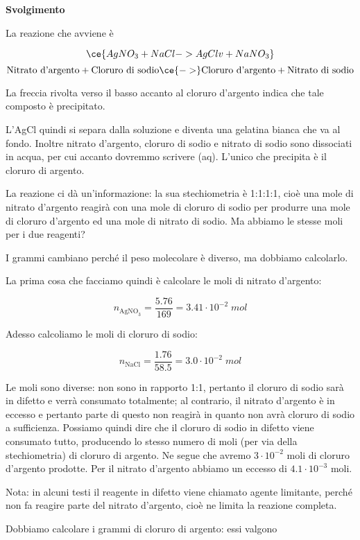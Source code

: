 \vspace{0.2cm}\large\textbf{Svolgimento}\normalsize

\vspace{0.2cm}La reazione che avviene è

$$\ce{AgNO_3 + NaCl -> AgCl v + NaNO_3}$$
$$\text{Nitrato d'argento} + \text{Cloruro di sodio} \ce{->} \text{Cloruro d'argento} + \text{Nitrato di sodio}$$

La freccia rivolta verso il basso accanto al cloruro d'argento indica che tale composto è precipitato.

L'AgCl quindi si separa dalla soluzione e diventa una gelatina bianca che va al fondo. Inoltre nitrato d'argento, cloruro di sodio e nitrato di sodio sono dissociati in acqua, per cui accanto dovremmo scrivere (aq). L'unico che precipita è il cloruro di argento.

La reazione ci dà un'informazione: la sua stechiometria è 1:1:1:1, cioè una mole di nitrato d'argento reagirà con una mole di cloruro di sodio per produrre una mole di cloruro d'argento ed una mole di nitrato di sodio. Ma abbiamo le stesse moli per i due reagenti?

I grammi cambiano perché il peso molecolare è diverso, ma dobbiamo calcolarlo.

La prima cosa che facciamo quindi è calcolare le moli di nitrato d'argento:

$$n_{\text{AgNO}_3}=\frac{5.76}{169}=3.41 \cdot 10^{-2} \; mol $$

Adesso calcoliamo le moli di cloruro di sodio:

$$n_{\text{NaCl}}=\frac{1.76}{58.5}=3.0 \cdot 10^{-2} \; mol $$

Le moli sono diverse: non sono in rapporto 1:1, pertanto il cloruro di sodio sarà in difetto e verrà consumato totalmente; al contrario, il nitrato d'argento è in eccesso e pertanto parte di questo non reagirà in quanto non avrà cloruro di sodio a sufficienza. Possiamo quindi dire che il cloruro di sodio in difetto viene consumato tutto, producendo lo stesso numero di moli (per via della stechiometria) di cloruro di argento. Ne segue che avremo $3 \cdot 10^{-2}$ moli di cloruro d'argento prodotte. Per il nitrato d'argento abbiamo un eccesso di $4.1 \cdot 10^{-3}$ moli.

Nota: in alcuni testi il reagente in difetto viene chiamato agente limitante, perché non fa reagire parte del nitrato d'argento, cioè ne limita la reazione completa.

Dobbiamo calcolare i grammi di cloruro di argento: essi valgono

